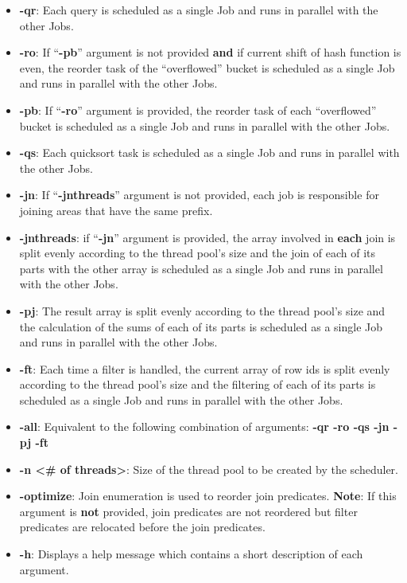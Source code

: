 \documentclass{ws-ijprai}
\begin{document}
\begin{itemize}
    \item \textbf{-qr}: Each query is scheduled as a single Job and runs in parallel with the other Jobs.
    \item \textbf{-ro}: If “\textbf{-pb}” argument is not provided \textbf{and} if current shift of hash function is even, the reorder task of the “overflowed” bucket is scheduled as a single Job and runs in parallel with the other Jobs.
    \item \textbf{-pb}: If “\textbf{-ro}” argument is provided, the reorder task of each “overflowed” bucket is scheduled as a single Job and runs in parallel with the other Jobs.
    \item \textbf{-qs}: Each quicksort task is scheduled as a single Job and runs in parallel with the other Jobs.
    \item \textbf{-jn}: If “\textbf{-jnthreads}” argument is not provided, each job is responsible for joining areas that have the same prefix.
    \item \textbf{-jnthreads}: if “\textbf{-jn}” argument is provided, the array involved in \textbf{each} join is split evenly according to the thread pool’s size and the join of each of its parts with the other array is scheduled as a single Job and runs in parallel with the other Jobs.
    \item \textbf{-pj}: The result array is split evenly according to the thread pool’s size and the calculation of the sums of each of its parts is scheduled as a single Job and runs in parallel with the other Jobs.
    \item \textbf{-ft}: Each time a filter is handled, the current array of row ids is split evenly according to the thread pool’s size and the filtering of each of its parts is scheduled as a single Job and runs in parallel with the other Jobs.
    \item \textbf{-all}: Equivalent to the following combination of arguments: \textbf{-qr -ro -qs -jn -pj -ft}
    \item \textbf{-n \textless \# of threads\textgreater}: Size of the thread pool to be created by the scheduler.
    \item \textbf{-optimize}: Join enumeration is used to reorder join predicates. \textbf{Note}: If this argument is \textbf{not} provided, join predicates are not reordered but filter predicates are relocated before the join predicates.
    \item \textbf{-h}: Displays a help message which contains a short description of each argument.
 \end{itemize}
 
\end{document}
